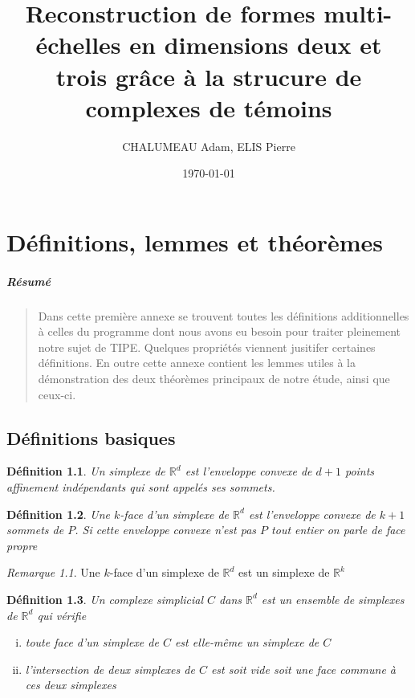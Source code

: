 \documentclass{report}
\title{\textbf{Reconstruction de formes multi-échelles en dimensions deux et trois grâce à la strucure de complexes de témoins}}
\author{CHALUMEAU Adam,	ELIS Pierre}
\date{\today}
\newcommand{\R}{\mathbb{R}}
\newtheorem{definition}{Définition}
\theoremstyle{remark}
\newtheorem*{rmq}{Remarque}
\begin{document}
\maketitle

\appendix
\chapter{Définitions, lemmes et théorèmes}
\paragraph{Résumé}
\begin{quote}
{\small Dans cette première annexe se trouvent toutes les définitions additionnelles à celles du programme dont nous avons eu besoin pour traiter pleinement notre sujet de TIPE. Quelques propriétés viennent jusitifer certaines définitions. En outre cette annexe contient les lemmes utiles à la démonstration des deux théorèmes principaux de notre étude, ainsi que ceux-ci.}
\end{quote}

\section{Définitions basiques}
\begin{definition}
	Un \textnormal{simplexe} de $\R^d$ est l'enveloppe convexe de $d+1$ points affinement indépendants qui sont appelés ses sommets.
\end{definition}

\begin{definition}
	Une \textnormal{$k$-face} d'un simplexe de $\R^d$ est l'enveloppe convexe de $k+1$ sommets de $P$. Si cette enveloppe convexe n'est pas $P$ tout entier on parle de \textnormal{face propre}
\end{definition}

\begin{rmq} 
	Une $k$-face d'un simplexe de $\R^d$ est un simplexe de $\R^k$
\end{rmq}

\begin{definition}
	Un \textnormal{complexe simplicial} $C$ dans $\R^d$ est un ensemble de simplexes de $\R^d$ qui vérifie
	\begin{enumerate}[(i)]
		\item toute face d'un simplexe de $C$ est elle-même un simplexe de $C$
		\item l'intersection de deux simplexes de $C$ est soit vide soit une face commune à ces deux simplexes
	\end{enumerate}
\end{definition}
\end{document}
